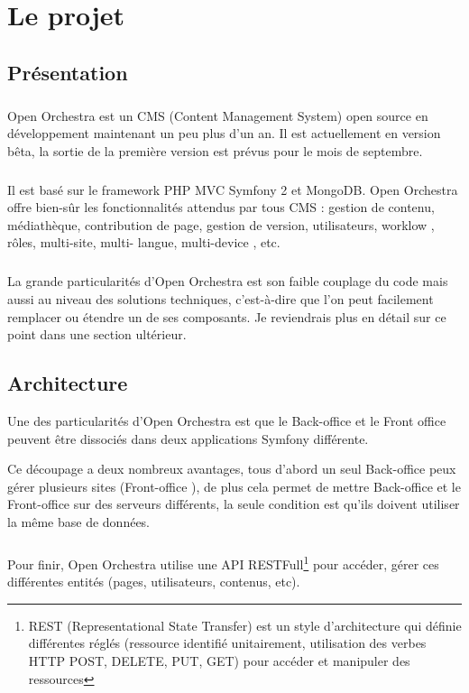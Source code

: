 \chapter{Le projet}
\section{Présentation}
        \paragraph{}
        Open Orchestra est un CMS (Content Management  System) open source en développement maintenant un peu plus d'un an. Il est actuellement en version bêta, la sortie de la première version est prévus pour le mois de septembre.
        \paragraph{}
        Il est basé sur le framework PHP MVC Symfony 2 et MongoDB. Open Orchestra offre bien-sûr les fonctionnalités attendus par tous CMS  : gestion de contenu, médiathèque, contribution de page, gestion de version, utilisateurs, \og worklow \fg{}, rôles,  multi-site, multi- langue,  multi-device , etc.
        \paragraph{}
        La grande particularités d'Open Orchestra est son faible couplage du code mais aussi au niveau des solutions techniques, c'est-à-dire que l'on peut facilement remplacer ou étendre un de ses composants. Je reviendrais plus en détail sur ce point dans une section ultérieur.
        
        \section{Architecture}
        Une des particularités d'Open Orchestra est que le \og Back-office \fg{} et le \og Front office \fg{} peuvent être dissociés dans deux applications Symfony différente. 

        Ce découpage a deux nombreux avantages, tous d'abord un seul \og Back-office \fg{}  peux gérer plusieurs sites (\og Front-office \fg{}), de plus cela permet de mettre \og Back-office \fg{} et le \og Front-office \fg{} sur des serveurs différents, la seule condition est qu'ils doivent utiliser la même base de données.
        \paragraph{}
		Pour finir, Open Orchestra utilise une API RESTFull\footnote{REST (Representational State Transfer) est un style d'architecture qui définie différentes réglés (ressource identifié unitairement, utilisation des verbes HTTP POST, DELETE, PUT, GET) pour accéder et manipuler des ressources } pour  accéder, gérer ces différentes entités (pages, utilisateurs, contenus, etc).
